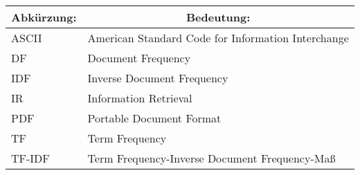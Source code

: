 \renewcommand{\arraystretch}{1.5}
\begin{center}
	\begin{tabular}{|l|l|}\hline
		\multicolumn{1}{|c|}{\textbf{Abkürzung:}} & \multicolumn{1}{c|}{\textbf{Bedeutung:}} \\ \hline
		ASCII & American Standard Code for Information Interchange \\ \hline
		DF & Document Frequency \\ \hline
		IDF & Inverse Document Frequency \\ \hline
		IR & Information Retrieval \\ \hline
		PDF & Portable Document Format \\ \hline
		TF & Term Frequency \\ \hline
		TF-IDF & Term Frequency-Inverse Document Frequency-Maß \\ \hline
	\end{tabular}
\end{center}
